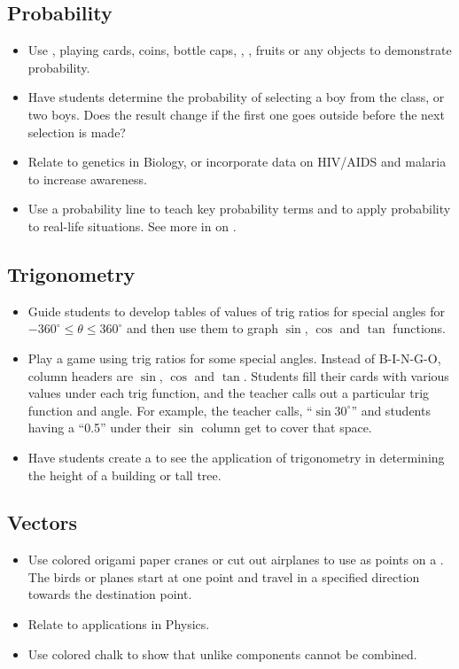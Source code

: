 	\subsection{Probability}
	\begin{itemize}
	\item Use , playing cards, coins, bottle caps, , , fruits or any objects to demonstrate probability.
	\item Have students determine the probability of selecting a boy from the class, or two boys. Does the result change if the first one goes outside before the next selection is made?
	\item Relate to genetics in Biology, or incorporate data on HIV\slash AIDS and malaria to increase awareness.
	\item Use a probability line to teach key probability terms and to apply probability to real-life situations. See more in  on .
	\end{itemize}

	\subsection{Trigonometry} \label{trig}
	\begin{itemize}
	\item Guide students to develop tables of values of trig ratios for special angles for $-360^\circ \leq \theta \leq 360^\circ$ and then use them to graph $\sin$, $\cos$ and $\tan$ functions.
	\item Play a  game using trig ratios for some special angles. Instead of B-I-N-G-O, column headers are $\sin$, $\cos$ and $\tan$. Students fill their cards with various values under each trig function, and the teacher calls out a particular trig function and angle. For example, the teacher calls, ``$\sin 30^\circ$'' and students having a ``0.5'' under their $\sin$ column get to cover that space.
	\item Have students create a  to see the application of trigonometry in determining the height of a building or tall tree.
	\end{itemize}

	\subsection{Vectors}
	\begin{itemize}
	\item Use colored origami paper cranes or cut out airplanes to use as points on a . The birds or planes start at one point and travel in a specified direction towards the destination point.
	\item Relate to applications in Physics.
	\item Use colored chalk to show that unlike components cannot be combined.
	\end{itemize}

